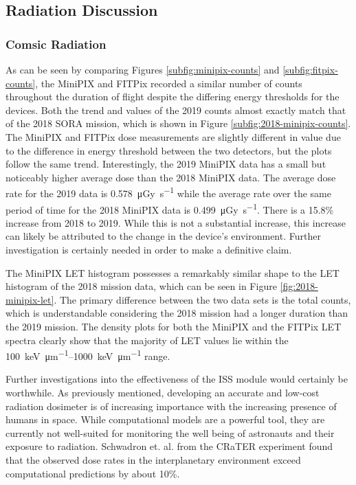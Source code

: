 \subsection{Radiation Discussion}
\label{sec:Radiation-Discussion}

\subsubsection{Comsic Radiation}
As can be seen by comparing Figures \ref{subfig:minipix-counts} and \ref{subfig:fitpix-counts}, the MiniPIX and FITPix recorded a similar number of counts throughout the duration of flight despite the differing energy thresholds for the devices.
Both the trend and values of the 2019 counts almost exactly match that of the 2018 SORA mission, which is shown in Figure \ref{subfig:2018-minipix-counts}.
The MiniPIX and FITPix dose measurements are slightly different in value due to the difference in energy threshold between the two detectors, but the plots follow the same trend.
Interestingly, the 2019 MiniPIX data has a small but noticeably higher average dose than the 2018 MiniPIX data.
The average dose rate for the 2019 data is \SI{0.578}{\micro\gray\per\second} while the average rate over the same period of time for the 2018 MiniPIX data is \SI{0.499}{\micro\gray\per\second}.
There is a 15.8\% increase from 2018 to 2019.
While this is not a substantial increase, this increase can likely be attributed to the change in the device's environment.
Further investigation is certainly needed in order to make a definitive claim.

The MiniPIX LET histogram possesses a remarkably similar shape to the LET histogram of the 2018 mission data, which can be seen in Figure \ref{fig:2018-minipix-let}.
The primary difference between the two data sets is the total counts, which is understandable considering the 2018 mission had a longer duration than the 2019 mission.
The density plots for both the MiniPIX and the FITPix LET spectra clearly show that the majority of LET values lie within the \SIrange{100}{1000}{\kilo\eV\per\micro\meter} range.

Further investigations into the effectiveness of the ISS module would certainly be worthwhile.
As previously mentioned, developing an accurate and low-cost radiation dosimeter is of increasing importance with the increasing presence of humans in space.
While computational models are a powerful tool, they are currently not well-suited for monitoring the well being of astronauts and their exposure to radiation.
Schwadron et. al. \cite{Schwadron-Update} from the CRaTER experiment found that the observed dose rates in the interplanetary environment exceed computational predictions by about 10\%.

